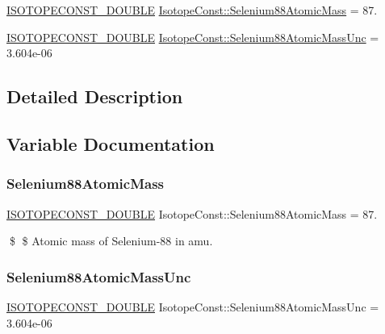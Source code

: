 \begin{DoxyCompactItemize}
\item 
\mbox{\hyperlink{group___isotope_const-_macros_ga8f45a7272ce02c0b4c65c44636ed719a}{I\+S\+O\+T\+O\+P\+E\+C\+O\+N\+S\+T\+\_\+\+D\+O\+U\+B\+LE}} \mbox{\hyperlink{group___isotope_const-_selenium-_se88_ga85c393963f2be0946ea8b71f689c646d}{Isotope\+Const\+::\+Selenium88\+Atomic\+Mass}} = 87.
\item 
\mbox{\hyperlink{group___isotope_const-_macros_ga8f45a7272ce02c0b4c65c44636ed719a}{I\+S\+O\+T\+O\+P\+E\+C\+O\+N\+S\+T\+\_\+\+D\+O\+U\+B\+LE}} \mbox{\hyperlink{group___isotope_const-_selenium-_se88_gae9e9af1cc115f92d074ae536c51892b2}{Isotope\+Const\+::\+Selenium88\+Atomic\+Mass\+Unc}} = 3.\+604e-\/06
\end{DoxyCompactItemize}


\subsection{Detailed Description}


\subsection{Variable Documentation}
\mbox{\label{group___isotope_const-_selenium-_se88_ga85c393963f2be0946ea8b71f689c646d}} 
\subsubsection{\texorpdfstring{Selenium88\+Atomic\+Mass}{Selenium88AtomicMass}}
{\footnotesize\ttfamily \mbox{\hyperlink{group___isotope_const-_macros_ga8f45a7272ce02c0b4c65c44636ed719a}{I\+S\+O\+T\+O\+P\+E\+C\+O\+N\+S\+T\+\_\+\+D\+O\+U\+B\+LE}} Isotope\+Const\+::\+Selenium88\+Atomic\+Mass = 87.}

\$ \$ Atomic mass of Selenium-\/88 in amu. \mbox{\label{group___isotope_const-_selenium-_se88_gae9e9af1cc115f92d074ae536c51892b2}} 
\subsubsection{\texorpdfstring{Selenium88\+Atomic\+Mass\+Unc}{Selenium88AtomicMassUnc}}
{\footnotesize\ttfamily \mbox{\hyperlink{group___isotope_const-_macros_ga8f45a7272ce02c0b4c65c44636ed719a}{I\+S\+O\+T\+O\+P\+E\+C\+O\+N\+S\+T\+\_\+\+D\+O\+U\+B\+LE}} Isotope\+Const\+::\+Selenium88\+Atomic\+Mass\+Unc = 3.\+604e-\/06}

